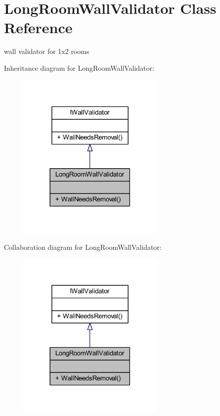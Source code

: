 \hypertarget{class_long_room_wall_validator}{}\section{Long\+Room\+Wall\+Validator Class Reference}
\label{class_long_room_wall_validator}


wall validator for 1x2 rooms  




Inheritance diagram for Long\+Room\+Wall\+Validator\+:\nopagebreak
\begin{figure}[H]
\begin{center}
\leavevmode
\includegraphics[width=201pt]{class_long_room_wall_validator__inherit__graph}
\end{center}
\end{figure}


Collaboration diagram for Long\+Room\+Wall\+Validator\+:\nopagebreak
\begin{figure}[H]
\begin{center}
\leavevmode
\includegraphics[width=201pt]{class_long_room_wall_validator__coll__graph}
\end{center}
\end{figure}
